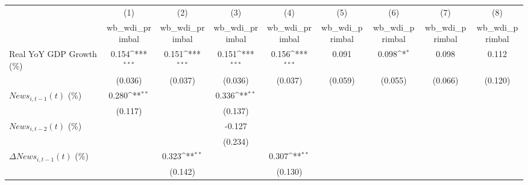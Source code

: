 {
\def\sym#1{\ifmmode^{#1}\else\(^{#1}\)\fi}
\begin{tabular}{l*{8}{c}}
\toprule
                    &\multicolumn{1}{c}{(1)}&\multicolumn{1}{c}{(2)}&\multicolumn{1}{c}{(3)}&\multicolumn{1}{c}{(4)}&\multicolumn{1}{c}{(5)}&\multicolumn{1}{c}{(6)}&\multicolumn{1}{c}{(7)}&\multicolumn{1}{c}{(8)}\\
                    &\multicolumn{1}{c}{wb_wdi_primbal}&\multicolumn{1}{c}{wb_wdi_primbal}&\multicolumn{1}{c}{wb_wdi_primbal}&\multicolumn{1}{c}{wb_wdi_primbal}&\multicolumn{1}{c}{wb_wdi_primbal}&\multicolumn{1}{c}{wb_wdi_primbal}&\multicolumn{1}{c}{wb_wdi_primbal}&\multicolumn{1}{c}{wb_wdi_primbal}\\
\midrule
Real YoY GDP Growth (\%)&       0.154\sym{***}&       0.151\sym{***}&       0.151\sym{***}&       0.156\sym{***}&       0.091         &       0.098\sym{*}  &       0.098         &       0.112         \\
                    &     (0.036)         &     (0.037)         &     (0.036)         &     (0.037)         &     (0.059)         &     (0.055)         &     (0.066)         &     (0.120)         \\
\addlinespace
$ News_{i,t-1}(t)$ (\%)&       0.280\sym{**} &                     &       0.336\sym{**} &                     &                     &                     &                     &                     \\
                    &     (0.117)         &                     &     (0.137)         &                     &                     &                     &                     &                     \\
\addlinespace
$ News_{i,t-2}(t)$ (\%)&                     &                     &      -0.127         &                     &                     &                     &                     &                     \\
                    &                     &                     &     (0.234)         &                     &                     &                     &                     &                     \\
\addlinespace
$ \Delta News_{i,t-1}(t)$ (\%)&                     &       0.323\sym{**} &                     &       0.307\sym{**} &                     &                     &                     &                     \\
                    &                     &     (0.142)         &                     &     (0.130)         &                     &                     &                     &                     \\

\end{tabular}}
